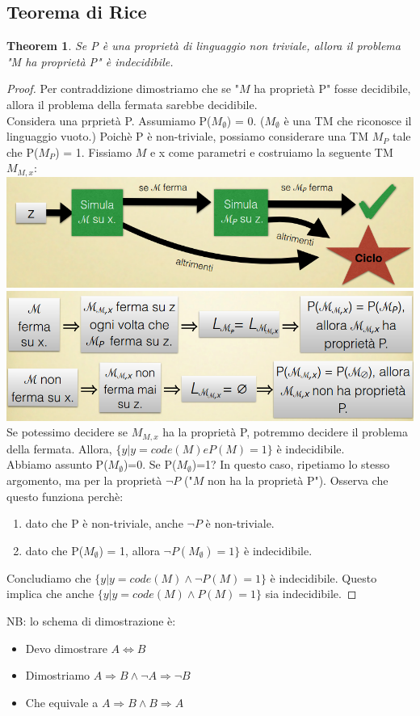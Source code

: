 \documentclass[a4paper, 12pt]{article}
\newtheorem{theorem}{Theorem}[section]
\begin{document}
\subsection{Teorema di Rice}
\begin{theorem}
Se P \`e una propriet\`a di linguaggio non triviale, allora il problema "M ha propriet\`a P" \`e indecidibile.
\end{theorem}
\begin{proof}
Per contraddizione  dimostriamo che se "$M$ ha propriet\`a P" fosse decidibile, allora il problema della fermata sarebbe decidibile.\\
Considera una prpriet\`a P. Assumiamo P($M_{\emptyset}$) = 0. ($M_{\emptyset}$ \`e una TM che riconosce il linguaggio vuoto.) Poich\`e P \`e non-triviale, possiamo considerare una TM $M_P$ tale che P($M_P$) = 1. Fissiamo $M$ e x come parametri e costruiamo la seguente TM $M_{M,x}$:\\
\includegraphics[scale=0.5]{TM_RICE1.png}\\
\includegraphics[scale=0.45]{RICE2.png}\\
Se potessimo decidere se $M_{M,x}$ ha la propriet\`a P, potremmo decidere il problema della fermata. Allora, $\{y|y=code(M) e P(M)=1\}$ \`e indecidibile.\\
Abbiamo assunto P($M_{\emptyset}$)=0. Se P($M_{\emptyset}$)=1? In questo caso, ripetiamo lo stesso argomento, ma per la propriet\`a $\neg P$ ("$M$ non ha la propriet\`a P"). Osserva che questo funziona perch\`e: \begin{enumerate}
\item dato che P \`e non-triviale, anche $\neg P$ \`e non-triviale.
\item dato che P($M_{\emptyset}$) = 1, allora $\neg P(M_{\emptyset}) = 1\}$ \`e indecidibile.
\end{enumerate}
Concludiamo che $\{y|y=code(M) \land \neg P(M) = 1\}$ \`e indecidibile. Questo implica che anche $\{y | y=code(M) \land P(M)=1\}$ sia indecidibile.
\end{proof}
NB: lo schema di dimostrazione \`e:
\begin{itemize}
\item Devo dimostrare $A \iff B$
\item Dimostriamo $A \Rightarrow B \land \neg A \Rightarrow \neg B$
\item Che equivale a $A \Rightarrow B \land B \Rightarrow A$
\end{itemize}
\end{document}

